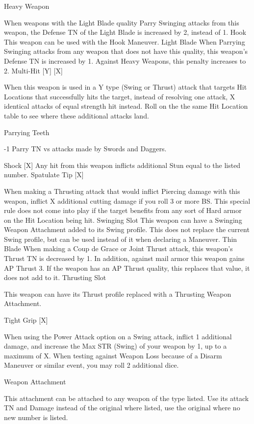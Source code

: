 \documentclass[oneside,11pt,english]{book}
\begin{document}
Heavy 
Weapon 

When weapons with the Light Blade quality Parry Swinging attacks from this weapon, the Defense 
TN of the Light Blade is increased by 2, instead of 1. 
Hook This weapon can be used with the Hook Maneuver. 
Light Blade When Parrying Swinging attacks from any weapon that does not have this quality, this weapon’s 
Defense TN is increased by 1. Against Heavy Weapons, this penalty increases to 2. 
Multi-Hit [Y] 
[X] 

When this weapon is used in a Y type (Swing or Thrust) attack that targets Hit Locations that 
successfully hits the target, instead of resolving one attack, X identical attacks of equal strength hit 
instead. Roll on the the same Hit Location table to see where these additional attacks land. 

Parrying 
Teeth 

-1 Parry TN vs attacks made by Swords and Daggers. 

Shock [X] Any hit from this weapon inflicts additional Stun equal to the listed number. 
Spatulate Tip 
[X] 

When making a Thrusting attack that would inflict Piercing damage with this weapon, inflict X 
additional cutting damage if you roll 3 or more BS. This special rule does not come into play if the 
target benefits from any sort of Hard armor on the Hit Location being hit. 
Swinging Slot This weapon can have a Swinging Weapon Attachment added to its Swing profile. This does not 
replace the current Swing profile, but can be used instead of it when declaring a Maneuver. 
Thin Blade When making a Coup de Grace or Joint Thrust attack, this weapon’s Thrust TN is decreased by 1. 
In addition, against mail armor this weapon gains AP Thrust 3. If the weapon has an AP Thrust 
quality, this replaces that value, it does not add to it. 
Thrusting 
Slot 

This weapon can have its Thrust profile replaced with a Thrusting Weapon Attachment. 

Tight Grip 
[X] 

When using the Power Attack option on a Swing attack, inflict 1 additional damage, and increase 
the Max STR (Swing) of your weapon by 1, up to a maximum of X. When testing against Weapon 
Loss because of a Disarm Maneuver or similar event, you may roll 2 additional dice. 

Weapon 
Attachment 

This attachment can be attached to any weapon of the type listed. Use its attack TN and Damage 
instead of the original where listed, use the original where no new number is listed. 
\end{document}
